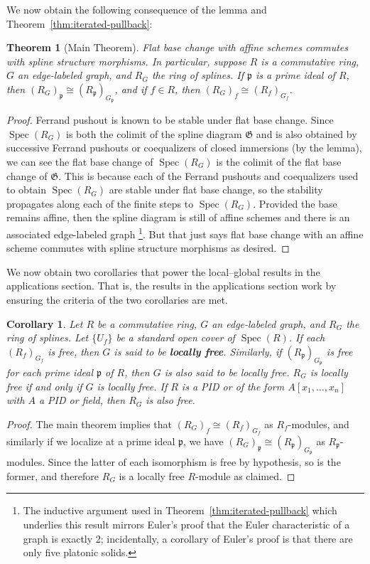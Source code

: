 \documentclass{article}
\DeclareMathOperator{\Spec}{Spec}
\newtheorem{corollary}{Corollary}
\newtheorem{theorem}{Theorem}
\begin{document}
We now obtain the following consequence of the lemma and Theorem~\ref{thm:iterated-pullback}:

\begin{theorem}[Main Theorem]
\label{thm:flat-base-change} 
Flat base change with affine schemes commutes with spline structure morphisms. In particular, suppose $R$ is a commutative ring, $G$ an edge-labeled graph, and $R_G$ the ring of splines. If $\mathfrak p$ is a prime ideal of $R$, then $(R_G)_{\mathfrak p} \cong (R_{\mathfrak p})_{G_{\mathfrak p}}$, and if $f \in R$, then $(R_G)_f \cong (R_f)_{G_f}$. 
\end{theorem}
\begin{proof} 
Ferrand pushout is known to be stable under flat base change. Since $\Spec(R_{G})$ is both the colimit of the spline diagram $\mathfrak G$ and is also obtained by successive Ferrand pushouts or coequalizers of closed immersions (by the lemma), we can see the flat base change of $\Spec(R_{G})$ is the colimit of the flat base change of $\mathfrak G$. This is because each of the Ferrand pushouts and coequalizers used to obtain $\Spec(R_{G})$ are stable under flat base change, so the stability propagates along each of the finite steps to $\Spec(R_{G})$. Provided the base remains affine, then the spline diagram is still of affine schemes and there is an associated edge-labeled graph \footnote{The inductive argument used in Theorem~\ref{thm:iterated-pullback} which underlies this result mirrors Euler's proof that the Euler characteristic of a graph is exactly 2; incidentally, a corollary of Euler's proof is that there are only five platonic solids.}. But that just says flat base change with an affine scheme commutes with spline structure morphisms as desired.
\end{proof}

We now obtain two corollaries that power the local--global results in the applications section. That is, the results in the applications section work by ensuring the criteria of the two corollaries are met.

\begin{corollary}
\label{cor:locally-free}
Let $R$ be a commutative ring, $G$ an edge-labeled graph, and $R_G$ the ring of splines. Let $\{U_f\}$ be a standard open cover of $\Spec(R)$. If each $(R_f)_{G_f}$ is free, then $G$ is said to be \textbf{locally free}. Similarly, if $(R_{\mathfrak p})_{G_{\mathfrak p}}$ is free for each prime ideal $\mathfrak p$ of $R$, then $G$ is also said to be locally free. $R_G$ is locally free if and only if $G$ is locally free. If $R$ is a PID or of the form $A[x_1,\dots,x_n]$ with $A$ a PID or field, then $R_G$ is also free.
\end{corollary}
\begin{proof}
The main theorem implies that $(R_G)_f \cong (R_f)_{G_f}$ as $R_f$-modules, and similarly if we localize at a prime ideal $\mathfrak p$, we have $(R_G)_{\mathfrak p} \cong (R_{\mathfrak p})_{G_{\mathfrak p}}$ as $R_{\mathfrak p}$-modules. Since the latter of each isomorphism is free by hypothesis, so is the former, and therefore $R_G$ is a locally free $R$-module as claimed.
\end{proof}
\end{document}
